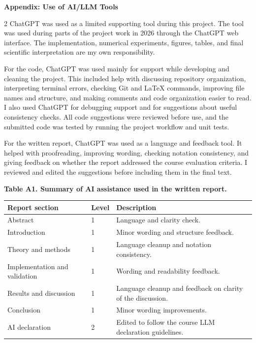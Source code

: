 \documentclass[10pt,a4paper]{article}
\begin{document}
\begin{center}
{\Large\bfseries Appendix: Use of AI/LLM Tools}\par
\end{center}
\vspace{0.25cm}

\begin{multicols}{2}
ChatGPT was used as a limited supporting tool during this project. The tool was used during parts of the project work in 2026 through the ChatGPT web interface. The implementation, numerical experiments, figures, tables, and final scientific interpretation are my own responsibility.

For the code, ChatGPT was used mainly for support while developing and cleaning the project. This included help with discussing repository organization, interpreting terminal errors, checking Git and \LaTeX{} commands, improving file names and structure, and making comments and code organization easier to read. I also used ChatGPT for debugging support and for suggestions about useful consistency checks. All code suggestions were reviewed before use, and the submitted code was tested by running the project workflow and unit tests.

For the written report, ChatGPT was used as a language and feedback tool. It helped with proofreading, improving wording, checking notation consistency, and giving feedback on whether the report addressed the course evaluation criteria. I reviewed and edited the suggestions before including them in the final text.
\end{multicols}

\noindent\textbf{Table A1. Summary of AI assistance used in the written report.}

\begin{center}
\setlength{\tabcolsep}{4pt}
\begin{tabularx}{\textwidth}{@{}p{}p{}X@{}}
\toprule
\textbf{Report section} & \textbf{Level} & \textbf{Description} \\
\midrule
Abstract & 1 & Language and clarity check. \\
Introduction & 1 & Minor wording and structure feedback. \\
Theory and methods & 1 & Language cleanup and notation consistency. \\
Implementation and validation & 1 & Wording and readability feedback. \\
Results and discussion & 1 & Language cleanup and feedback on clarity of the discussion. \\
Conclusion & 1 & Minor wording improvements. \\
AI declaration & 2 & Edited to follow the course LLM declaration guidelines. \\
\bottomrule
\end{tabularx}
\end{center}
\end{document}
